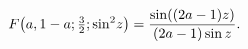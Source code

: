 \[\mathop{F\/}\nolimits\!\left(a,1-a;\tfrac{3}{2};{\mathop{\sin\/}\nolimits^{2}}%
z\right)=\frac{\mathop{\sin\/}\nolimits\!\left((2a-1)z\right)}{(2a-1)\mathop{%
\sin\/}\nolimits z}.\]